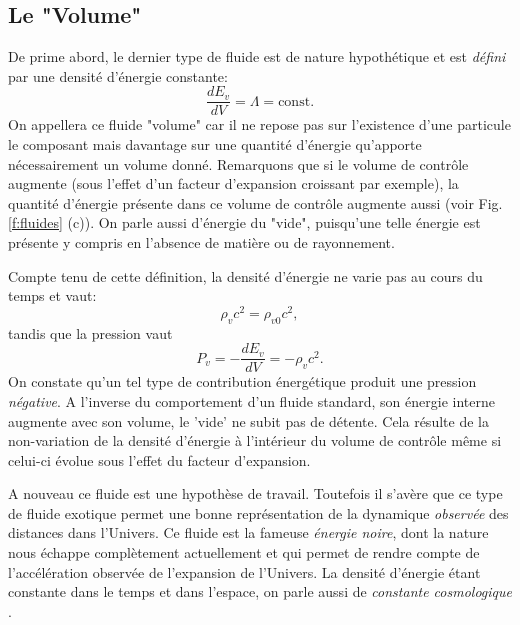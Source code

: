 \subsection{Le "Volume"}
De prime abord, le dernier type de fluide est de nature hypothétique et est \textit{défini} par une densité d'énergie constante:
\begin{equation}
\frac{dE_v}{dV}=\Lambda=\mathrm{const.}
\end{equation}
On appellera ce fluide "volume" car il ne repose pas sur l'existence d'une particule le composant mais davantage sur une quantité d'énergie qu'apporte nécessairement un volume donné. Remarquons que si le volume de contrôle augmente (sous l'effet d'un facteur d'expansion croissant par exemple), la quantité d'énergie présente dans ce volume de contrôle augmente aussi (voir Fig. \ref{f:fluides} (c)).  On parle aussi d'énergie du "vide", puisqu'une telle énergie est présente y compris en l'absence de matière ou de rayonnement.

Compte tenu de cette définition, la densité d'énergie ne varie pas au cours du temps et vaut:
\begin{equation}
\rho_vc^2=\rho_{v0}c^2,
\end{equation}
tandis que la pression vaut
\begin{equation}
P_v=-\frac{dE_v}{dV}=-\rho_vc^2.
\end{equation}
On constate qu'un tel type de contribution énergétique produit une pression \textit{négative}. A l'inverse du comportement d'un fluide standard, son énergie interne augmente avec son volume, le 'vide' ne subit pas de détente. Cela résulte de la non-variation de la densité d'énergie à l'intérieur du volume de contrôle même si celui-ci évolue sous l'effet du facteur d'expansion.

A nouveau ce fluide est une hypothèse de travail. Toutefois il s'avère que ce type de fluide exotique permet une bonne représentation de la dynamique \textit{observée} des distances dans l'Univers. Ce fluide est la fameuse \textit{énergie noire}, dont la nature nous échappe complètement actuellement et qui permet de rendre compte de l'accélération observée de l'expansion de l'Univers. La densité d'énergie étant constante dans le temps et dans l'espace, on parle aussi de \textit{constante cosmologique} .

